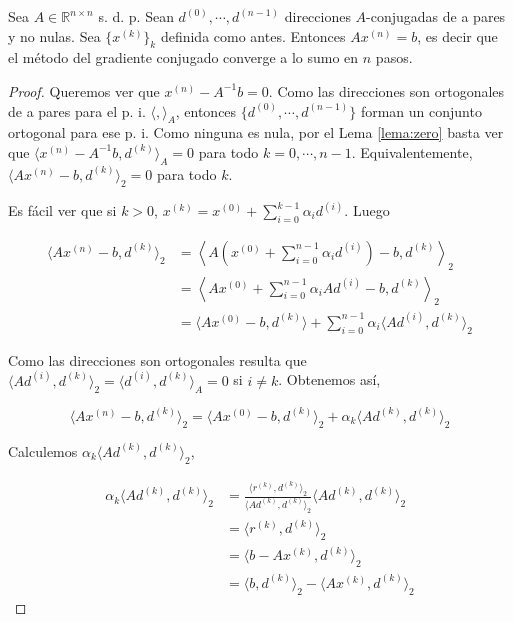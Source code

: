 \begin{propo}
Sea $A \in \mathbb{R}^{n \times n}$ s. d. p. Sean $d^{(0)}, \cdots, d^{(n - 1)}$ direcciones $A$-conjugadas de a pares y no nulas. Sea $\{x^{(k)}\}_k$ definida como antes. Entonces $Ax^{(n)} = b$, es decir que el método del gradiente conjugado converge a lo sumo en $n$ pasos.

\begin{proof}
Queremos ver que $x^{(n)} - A^{-1}b = 0$. Como las direcciones son ortogonales de a pares para el p. i. $\langle, \rangle_A$, entonces $\{d^{(0)}, \cdots, d^{(n - 1)}\}$ forman un conjunto ortogonal para ese p. i. Como ninguna es nula, por el Lema \ref{lema:zero} basta ver que $\langle x^{(n)} - A^{-1}b, d^{(k)}\rangle_A = 0$ para todo $k = 0, \cdots, n - 1$. Equivalentemente, $\langle Ax^{(n)} -b , d^{(k)}\rangle_2 = 0$ para todo $k$. 

Es fácil ver que si $k > 0$, $x^{(k)} = x^{(0)} + \sum_{i = 0}^{k - 1} \alpha_i d^{(i)}$. Luego

\begin{align*}
\langle Ax^{(n)} - b, d^{(k)} \rangle_2 & = \left\langle A \left(x^{(0)} + \sum_{i = 0}^{n - 1} \alpha_i d^{(i)}\right) - b, d^{(k)} \right\rangle_2 \\
& = \left\langle Ax^{(0)} + \sum_{i = 0}^{n - 1} \alpha_i A d^{(i)} - b, d^{(k)} \right\rangle_2\\
& = \langle Ax^{(0)} - b, d^{(k)} \rangle + \sum_{i = 0}^{n - 1} \alpha_i \langle Ad^{(i)}, d^{(k)}\rangle_2
\end{align*}

Como las direcciones son ortogonales resulta que $\langle Ad^{(i)}, d^{(k)} \rangle_2 = \langle d^{(i)}, d^{(k)} \rangle_A = 0$ si $i \neq k$. Obtenemos así,

\[\langle Ax^{(n)} - b, d^{(k)} \rangle_2 = \langle Ax^{(0)} - b, d^{(k)} \rangle_2 + \alpha_k \langle Ad^{(k)}, d^{(k)} \rangle_2 \]

Calculemos $\alpha_k \langle Ad^{(k)}, d^{(k)} \rangle_2$,

\begin{align*}
\alpha_k \langle Ad^{(k)}, d^{(k)} \rangle_2 &= \frac{\langle r^{(k)}, d^{(k)} \rangle_2}{\langle Ad^{(k)}, d^{(k)} \rangle_2} \langle Ad^{(k)}, d^{(k)} \rangle_2\\
& = \langle r^{(k)}, d^{(k)} \rangle_2\\
& = \langle b - Ax^{(k)}, d^{(k)} \rangle_2\\
& = \langle b, d^{(k)} \rangle_2 - \langle Ax^{(k)}, d^{(k)} \rangle_2
\end{align*}


\end{proof}
\end{propo}

